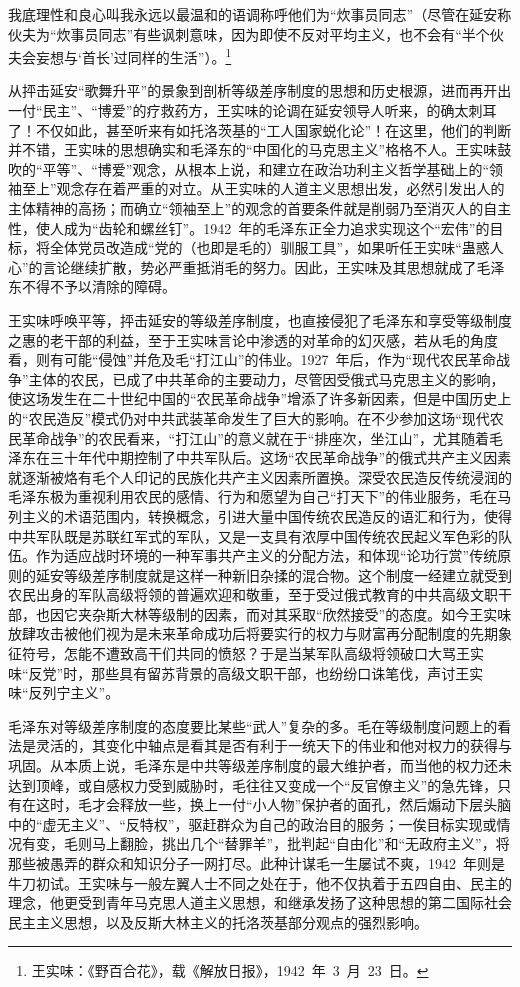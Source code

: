 \begin{quoting}
我底理性和良心叫我永远以最温和的语调称呼他们为“炊事员同志”（尽管在延安称伙夫为“炊事员同志”有些讽刺意味，因为即使不反对平均主义，也不会有“半个伙夫会妄想与‘首长’过同样的生活”）。\footnote{王实味：《野百合花》，载《解放日报》，1942~年~3~月~23~日。}
\end{quoting}从抨击延安“歌舞升平”的景象到剖析等级差序制度的思想和历史根源，进而再开出一付“民主”、“博爱”的疗救药方，王实味的论调在延安领导人听来，的确太刺耳了！不仅如此，甚至听来有如托洛茨基的“工人国家蜕化论”！在这里，他们的判断并不错，王实味的思想确实和毛泽东的“中国化的马克思主义”格格不人。王实味鼓吹的“平等”、“博爱”观念，从根本上说，和建立在政治功利主义哲学基础上的“领袖至上”观念存在着严重的对立。从王实味的人道主义思想出发，必然引发出人的主体精神的高扬；而确立“领袖至上”的观念的首要条件就是削弱乃至消灭人的自主性，使人成为“齿轮和螺丝钉”。1942~年的毛泽东正全力追求实现这个“宏伟”的目标，将全体党员改造成“党的（也即是毛的）驯服工具”，如果听任王实味“蛊惑人心”的言论继续扩散，势必严重抵消毛的努力。因此，王实味及其思想就成了毛泽东不得不予以清除的障碍。

王实味呼唤平等，抨击延安的等级差序制度，也直接侵犯了毛泽东和享受等级制度之惠的老干部的利益，至于王实味言论中渗透的对革命的幻灭感，若从毛的角度看，则有可能“侵蚀”并危及毛“打江山”的伟业。1927~年后，作为“现代农民革命战争”主体的农民，已成了中共革命的主要动力，尽管因受俄式马克思主义的影响，使这场发生在二十世纪中国的“农民革命战争”增添了许多新因素，但是中国历史上的“农民造反”模式仍对中共武装革命发生了巨大的影响。在不少参加这场“现代农民革命战争”的农民看来，“打江山”的意义就在于“排座次，坐江山”，尤其随着毛泽东在三十年代中期控制了中共军队后。这场“农民革命战争”的俄式共产主义因素就逐渐被烙有毛个人印记的民族化共产主义因素所置换。深受农民造反传统浸润的毛泽东极为重视利用农民的感情、行为和愿望为自己“打天下”的伟业服务，毛在马列主义的术语范围内，转换概念，引进大量中国传统农民造反的语汇和行为，使得中共军队既是苏联红军式的军队，又是一支具有浓厚中国传统农民起义军色彩的队伍。作为适应战时环境的一种军事共产主义的分配方法，和体现“论功行赏”传统原则的延安等级差序制度就是这样一种新旧杂揉的混合物。这个制度一经建立就受到农民出身的军队高级将领的普遍欢迎和敬重，至于受过俄式教育的中共高级文职干部，也因它夹杂斯大林等级制的因素，而对其采取“欣然接受”的态度。如今王实味放肆攻击被他们视为是未来革命成功后将要实行的权力与财富再分配制度的先期象征符号，怎能不遭致高干们共同的愤怒？于是当某军队高级将领破口大骂王实味“反党”时，那些具有留苏背景的高级文职干部，也纷纷口诛笔伐，声讨王实味“反列宁主义”。

毛泽东对等级差序制度的态度要比某些“武人”复杂的多。毛在等级制度问题上的看法是灵活的，其变化中轴点是看其是否有利于一统天下的伟业和他对权力的获得与巩固。从本质上说，毛泽东是中共等级差序制度的最大维护者，而当他的权力还未达到顶峰，或自感权力受到威胁时，毛往往又变成一个“反官僚主义”的急先锋，只有在这时，毛才会释放一些，换上一付“小人物”保护者的面孔，然后煽动下层头脑中的“虚无主义”、“反特权”，驱赶群众为自己的政治目的服务；一俟目标实现或情况有变，毛则马上翻脸，挑出几个“替罪羊”，批判起“自由化”和“无政府主义”，将那些被愚弄的群众和知识分子一网打尽。此种计谋毛一生屡试不爽，1942~年则是牛刀初试。王实味与一般左翼人士不同之处在于，他不仅执着于五四自由、民主的理念，他更受到青年马克思人道主义思想，和继承发扬了这种思想的第二国际社会民主主义思想，以及反斯大林主义的托洛茨基部分观点的强烈影响。


